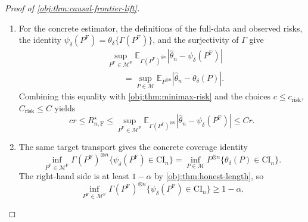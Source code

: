 \begin{proof}[Proof of \cref{obj:thm:causal-frontier-lift}]
\begin{enumerate}
\item For the concrete estimator, the definitions of the full-data and observed
risks, the identity
\(\psi_\delta(P^{\mathrm F})=\theta_\delta\{\Gamma(P^{\mathrm F})\}\), and the
surjectivity of \(\Gamma\) give
\[
\begin{aligned}
&\sup_{P^{\mathrm F}\in\mathcal M^{\mathrm F}}
\mathbb E_{\Gamma(P^{\mathrm F})^{\otimes n}}
\left|\widehat\theta_n-\psi_\delta(P^{\mathrm F})\right|  \\
&\qquad =
\sup_{P\in\mathcal M}
\mathbb E_{P^{\otimes n}}
\left|\widehat\theta_n-\theta_\delta(P)\right|.
\end{aligned}
\]
Combining this equality with \cref{obj:thm:minimax-risk} and the choices
\(c\le c_{\mathrm{risk}}\), \(C_{\mathrm{risk}}\le C\) yields
\[
c r
\le
R_{n,\mathrm F}^\star
\le
\sup_{P^{\mathrm F}\in\mathcal M^{\mathrm F}}
\mathbb E_{\Gamma(P^{\mathrm F})^{\otimes n}}
\left|\widehat\theta_n-\psi_\delta(P^{\mathrm F})\right|
\le
C r .
\]

\item The same target transport gives the concrete coverage identity
\[
\inf_{P^{\mathrm F}\in\mathcal M^{\mathrm F}}
\Gamma(P^{\mathrm F})^{\otimes n}
\{\psi_\delta(P^{\mathrm F})\in \mathrm{CI}_n\}
=
\inf_{P\in\mathcal M}
P^{\otimes n}\{\theta_\delta(P)\in \mathrm{CI}_n\}.
\]
The right-hand side is at least \(1-\alpha\) by
\cref{obj:thm:honest-length}, so
\[
\inf_{P^{\mathrm F}\in\mathcal M^{\mathrm F}}
\Gamma(P^{\mathrm F})^{\otimes n}
\{\psi_\delta(P^{\mathrm F})\in \mathrm{CI}_n\}
\ge 1-\alpha .
\]


\end{enumerate}
\end{proof}
